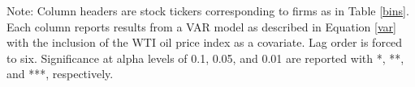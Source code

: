 \documentclass[11pt]{article}
\begin{document}
\begin{table}[!htbp] \centering 
	\caption{Bivariate Time Series Model with D5 RINs and WTI Covariate} 
	\label{d5timeseries6lags} 
	\begin{flushleft}
		\scriptsize{Note: Column headers are stock tickers corresponding to firms as in Table \ref{bins}. Each column reports results from a VAR model as described in Equation \ref{var} with the inclusion of the WTI oil price index as a covariate. Lag order is forced to six. Significance at alpha levels of 0.1, 0.05, and 0.01 are reported with *, **, and ***, respectively.}\\
	\end{flushleft}
\end{table} 
\end{document}
